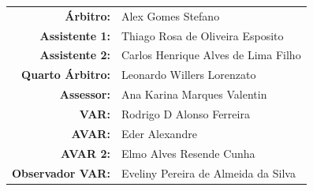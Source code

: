\documentclass[11pt]{article}
\begin{document}
\vspace{0.5cm}
\begin{minipage}{0.65\textwidth}
\begin{center}
\begin{tabular}{rl}
\textbf{Árbitro:} & Alex Gomes Stefano \\
\textbf{Assistente 1:} & Thiago Rosa de Oliveira Esposito \\
\textbf{Assistente 2:} & Carlos Henrique Alves de Lima Filho \\
\textbf{Quarto Árbitro:} & Leonardo Willers Lorenzato \\
\textbf{Assessor:} & Ana Karina Marques Valentin \\
\textbf{VAR:} & Rodrigo D Alonso Ferreira \\
\textbf{AVAR:} & Eder Alexandre \\
\textbf{AVAR 2:} & Elmo Alves Resende Cunha \\
\textbf{Observador VAR:} & Eveliny Pereira de Almeida da Silva \\
\end{tabular}
\end{center}
\end{minipage}
\begin{minipage}{0.3\textwidth}
\end{minipage}
\newpage
\end{document}

